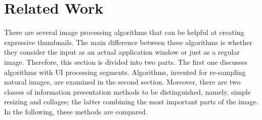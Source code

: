 \documentclass[draft,final]{vutinfth} %
\begin{document}
	
	\chapter{Related Work}
	There are several image processing algorithms that can be helpful at creating expressive thumbnails.
	The main difference between these algorithms is whether they consider the input as an actual application window or just as a regular image.
	Therefore, this section is divided into two parts.
	The first one discusses algorithms with UI processing segments.
	Algorithms, invented for re-sampling natural images, are examined in the second section. 
	Moreover, there are two classes of information presentation methods to be distinguished, namely, simple resizing and collages; the latter combining the most important parts of the image. 
	In the following, these methods are compared.
	
\end{document}
